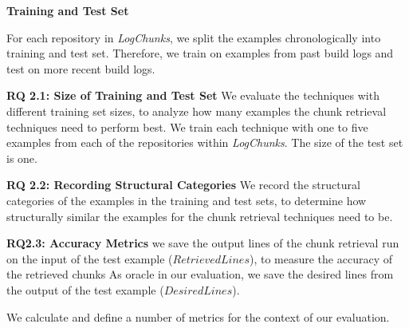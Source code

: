 
\noindent
\textbf{Training and Test Set}

For each repository in \emph{LogChunks}, we split the examples
chronologically into training and test set.
Therefore, we train on
examples from past build logs and test on more recent build logs.

\noindent %
\textbf{RQ 2.1: Size of Training and Test Set}
We evaluate the techniques with different training set
sizes, to analyze how many examples the chunk retrieval techniques need to
perform best.
We train each technique with one to five examples from each of
the repositories within \emph{LogChunks}.
The size of the test set is one.

\noindent
\textbf{RQ 2.2: Recording Structural Categories}
We record the structural categories
of the examples in the training and test sets, to determine how
structurally similar the examples for the chunk
retrieval techniques need to be.

\noindent
\textbf{RQ2.3: Accuracy Metrics}
we save the output lines of the chunk retrieval run on the input
of the test example ($\mathit{RetrievedLines}$), to measure the
accuracy of the retrieved chunks
As oracle in our evaluation, we save the
desired lines from the output of the test example
($\mathit{DesiredLines}$).

We calculate and define a number of metrics for the context of our
evaluation.

